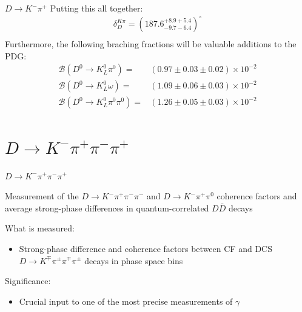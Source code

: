 \documentclass{beamer}
\begin{document}
\begin{frame}{$D\to K^-\pi^+$}
  \vspace{0.0cm}
  {\large Putting this all together:}
  \begin{align*}
    \delta_D^{K\pi} = (187.6^{+8.9+5.4}_{-9.7-6.4})^\circ \\
  \end{align*}
  {\large Furthermore, the following braching fractions will be valuable additions to the PDG:}
  \begin{align*}
    \mathcal{B}(D^0\to K_L^0\pi^0) =& (0.97 \pm 0.03 \pm 0.02)\times10^{-2} \\
    \mathcal{B}(D^0\to K_L^0\omega) =& (1.09 \pm 0.06 \pm 0.03)\times10^{-2} \\
    \mathcal{B}(D^0\to K_L^0\pi^0\pi^0) =& (1.26 \pm 0.05 \pm 0.03)\times10^{-2}
  \end{align*}
\end{frame}

\section{\texorpdfstring{$D\to K^-\pi^+\pi^-\pi^+$}{D2Kpipipi}}
\begin{frame}{$D\to K^-\pi^+\pi^-\pi^+$}
  \begin{tcolorbox}[enhanced,frame style image=blueshade_cropped.png,
    opacityback=0.75,opacitybacktitle=0.25,
    colback=blue!5!white,colframe=blue!75!black,
    title=\color{white}{\href{https://link.springer.com/article/10.1007/JHEP05(2021)164}{\color{white}{JHEP \textbf{5} (2021) 164}}}]
    {\Large Measurement of the $D\to K^-\pi^+\pi^-\pi^-$ and $D\to K^-\pi^+\pi^0$ coherence factors and average strong-phase differences in quantum-correlated $D\bar{D}$ decays}
  \end{tcolorbox}
  \vspace{0.5cm}
  What is measured:
  \begin{itemize}
    \item{Strong-phase difference and coherence factors between CF and DCS $D\to K^\mp\pi^\pm\pi^\mp\pi^\pm$ decays in phase space bins}
  \end{itemize}
  \vspace{0.5cm}
  Significance:
  \begin{itemize}
    \item{Crucial input to one of the most precise measurements of $\gamma$}
  \end{itemize}
\end{frame}
\end{document}
